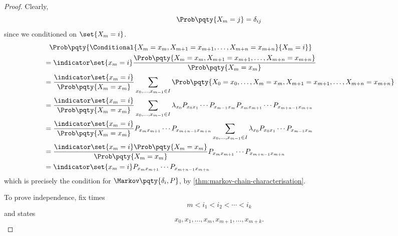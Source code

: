 \begin{proof}
    Clearly,
    \[
        \Prob\pqty{X_m = j} = \delta_{ij}
    \]
    since we conditioned on \(\set{X_m = i}\).
    \begin{align*}
        &\phantom{=} \Prob\pqty{\Conditional{X_m = x_m, X_{m + 1} = x_{m + 1}, \ldots, X_{m + n} = x_{m + n}}{X_m = i}} \\
        &= \indicator \set{x_m = i} \frac{\Prob\pqty{X_m = x_m, X_{m + 1} = x_{m + 1}, \ldots, X_{m + n} = x_{m + n}}}{\Prob\pqty{X_m = x_m}} \\
        &= \frac{\indicator \set{x_m = i}}{\Prob\pqty{X_m = x_m}} \sum_{x_0, \ldots, x_{m - 1} \in I} \Prob\pqty{X_0 = x_0, \ldots, X_m = x_m, X_{m + 1} = x_{m + 1}, \ldots, X_{m + n} = x_{m + n}} \\
        &= \frac{\indicator \set{x_m = i}}{\Prob\pqty{X_m = x_m}} \sum_{x_0, \ldots, x_{m - 1} \in I} \lambda_{x_0} P_{x_0 x_1} \cdots P_{x_{m - 1} x_m} P_{x_m x_{m + 1}} \cdots P_{x_{m + n - 1} x_{m + n}} \\
        &= \frac{\indicator \set{x_m = i}}{\Prob\pqty{X_m = x_m}} P_{x_m x_{m + 1}} \cdots P_{x_{m + n - 1} x_{m + n}} \sum_{x_0, \ldots, x_{m - 1} \in I} \lambda_{x_0} P_{x_0 x_1} \cdots P_{x_{m - 1} x_m} \\
        &= \frac{\indicator \set{x_m = i} \Prob\pqty{X_m = x_m}}{\Prob\pqty{X_m = x_m}} P_{x_m x_{m + 1}} \cdots P_{x_{m + n - 1} x_{m + n}} \\
        &= \indicator \set{x_m = i} P_{x_m x_{m + 1}} \cdots P_{x_{m + n - 1} x_{m + n}}
    \end{align*}
    which is precisely the condition for \(\Markov\pqty{\delta_i, P}\), by \autoref{thm:markov-chain-characterisation}.

    To prove independence, fix times
    \[
        m < i_1 < i_2 < \cdots < i_k
    \]
    and states
    \[
        x_0, x_1, \ldots, x_m, x_{m + 1}, \ldots, x_{m + k}.
    \]


\end{proof}
